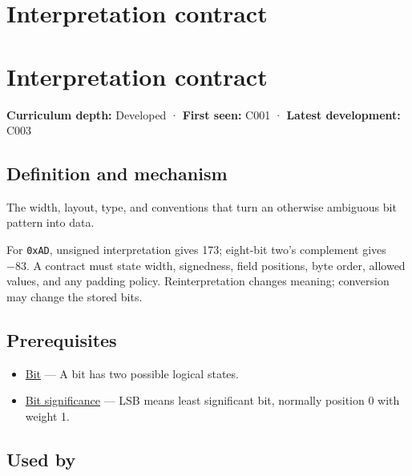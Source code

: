 \hypertarget{appendix-f414bd4ed05c}{}
\section*{Interpretation contract}
\section{Interpretation contract}\label{interpretation-contract}

\textbf{Curriculum depth:} Developed · \textbf{First seen:} C001 · \textbf{Latest development:} C003

\subsection{Definition and mechanism}\label{definition-and-mechanism}

The width, layout, type, and conventions that turn an otherwise ambiguous bit pattern into data.

For \texttt{0xAD}, unsigned interpretation gives 173; eight-bit two's complement gives −83. A contract must state width, signedness, field positions, byte order, allowed values, and any padding policy. Reinterpretation changes meaning; conversion may change the stored bits.

\subsection{Prerequisites}\label{prerequisites}

\begin{itemize}
\tightlist
\item
  \hyperref[appendix-ddbb69998a2e]{Bit} --- A bit has two possible logical states.
\item
  \hyperref[appendix-280445746493]{Bit significance} --- LSB means least significant bit, normally position 0 with weight 1.
\end{itemize}

\subsection{Used by}\label{used-by}

